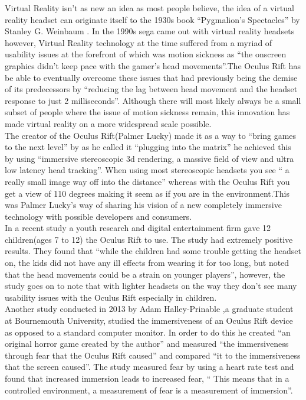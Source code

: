 \documentclass[a4paper]{article}
\begin{document}
\indent \indent Virtual Reality isn’t as new an idea as most people believe, the idea of a virtual reality headset can originate itself to the 1930s book ``Pygmalion's Spectacles'' by Stanley G. Weinbaum \cite{1}. In the 1990s sega came out with virtual reality headsets however, Virtual Reality technology at the time suffered from a myriad of usability issues at the forefront of which was motion sickness as “the onscreen graphics didn’t keep pace with the gamer’s head movements”\cite{2}.The Oculus Rift has be able to eventually overcome these issues that had previously being the demise of its predecessors by “reducing the lag between head movement and the headset response to just 2 milliseconds”\cite{2}. Although there will most likely always be a small subset of people where the issue of motion sickness remain, this  innovation has made virtual reality on a more widespread scale possible.\\
\indent The creator of the Oculus Rift(Palmer Lucky) made it as a way to “bring games to the next level” by as he called it “plugging into the matrix” he achieved this by using “immersive stereoscopic 3d rendering, a massive field of view and ultra low latency head tracking”\cite{3}. When using most stereoscopic headsets you see “ a really small image way off into the distance” whereas with the Oculus Rift you get a view of 110 degrees making it seem as if you are in the environment\cite{3}.This was Palmer Lucky’s way of sharing his vision of a new completely immersive technology with possible developers and consumers.\\
\indent In a recent study a youth research and digital entertainment firm gave 12 children(ages 7 to 12) the Oculus Rift to use. The study had extremely positive results. They found that “while the children had some trouble getting the headset on, the kids did not have any ill effects from wearing it for too long, but noted that the head movements could be a strain on younger players”\cite{4}, however, the study goes on to note that with lighter headsets on the way they don’t see many usability issues with the Oculus Rift especially in children.\\
\indent Another study conducted in 2013 by Adam Halley-Prinable ,a graduate student at Bournemouth University, studied the immersiveness of an Oculus Rift device as opposed to a standard computer monitor. In order to do this he created “an original horror game created by the author” and measured “the immersiveness through fear that the Oculus Rift caused” and compared “it to the immersiveness that the screen caused”\cite{7}.  The study measured fear by using a heart rate test and found that increased immersion leads to increased fear, “ This means that in a controlled environment, a measurement of fear is a measurement of immersion”\cite{7}. 
\end{document}
